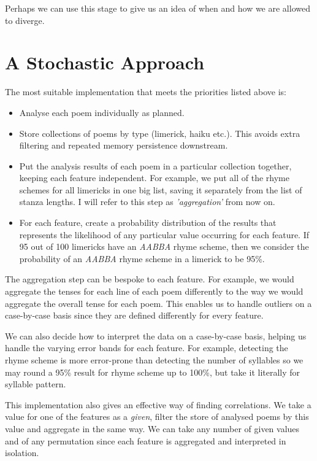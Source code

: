 Perhaps we can use this stage to give us an idea of when and how we are allowed to diverge.


\section{A Stochastic Approach}
\label{sec:approach}

The most suitable implementation that meets the priorities listed above is:
\begin{itemize}
\item{Analyse each poem individually as planned.}
\item{Store collections of poems by type (limerick, haiku etc.). This avoids extra filtering and repeated memory persistence downstream.}
\item{Put the analysis results of each poem in a particular collection together, keeping each feature independent. For example, we put all of the rhyme schemes for all limericks in one big list, saving it separately from the list of stanza lengths. I will refer to this step as \textit{'aggregation'} from now on.}
\item{For each feature, create a probability distribution of the results that represents the likelihood of any particular value occurring for each feature. If 95 out of 100 limericks have an \textit{AABBA} rhyme scheme, then we consider the probability of an \textit{AABBA} rhyme scheme in a limerick to be 95\%.}
\end{itemize}

The aggregation step can be bespoke to each feature. For example, we would aggregate the tenses for each line of each poem differently to the way we would aggregate the overall tense for each poem. This enables us to handle outliers on a case-by-case basis since they are defined differently for every feature.

We can also decide how to interpret the data on a case-by-case basis, helping us handle the varying error bands for each feature. For example, detecting the rhyme scheme is more error-prone than detecting the number of syllables so we may round a 95\% result for rhyme scheme up to 100\%, but take it literally for syllable pattern.

This implementation also gives an effective way of finding correlations. We take a value for one of the features as a \textit{given}, filter the store of analysed poems by this value and aggregate in the same way. We can take any number of given values and of any permutation since each feature is aggregated and interpreted in isolation.

